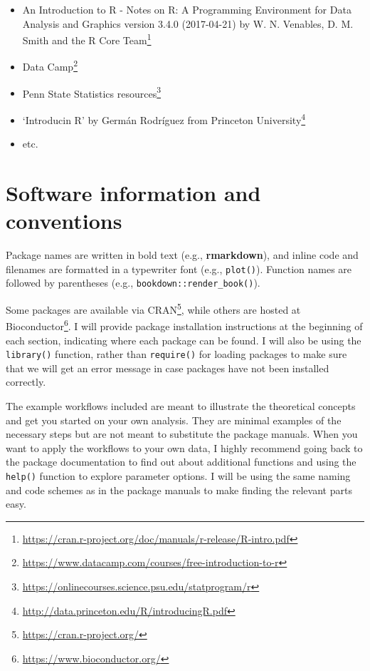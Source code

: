 \documentclass[12pt,]{krantz}
\providecommand{\tightlist}{%
  \setlength{\itemsep}{0pt}\setlength{\parskip}{0pt}}
\renewcommand{\href}[2]{#2\footnote{\url{#1}}}
\theoremstyle{definition}
\theoremstyle{definition}
\theoremstyle{definition}
\theoremstyle{remark}
\begin{document}
\begin{itemize}
\tightlist
\item
  \href{https://cran.r-project.org/doc/manuals/r-release/R-intro.pdf}{An
  Introduction to R - Notes on R: A Programming Environment for Data
  Analysis and Graphics version 3.4.0 (2017-04-21) by W. N. Venables, D.
  M. Smith and the R Core Team}
\item
  \href{https://www.datacamp.com/courses/free-introduction-to-r}{Data
  Camp}
\item
  \href{https://onlinecourses.science.psu.edu/statprogram/r}{Penn State
  Statistics resources}
\item
  \href{http://data.princeton.edu/R/introducingR.pdf}{`Introducin R' by
  Germán Rodríguez from Princeton University}
\item
  etc.
\end{itemize}

\section*{Software information and
conventions}\label{software-information-and-conventions}


Package names are written in bold text (e.g., \textbf{rmarkdown}), and
inline code and filenames are formatted in a typewriter font (e.g.,
\texttt{plot()}). Function names are followed by parentheses (e.g.,
\texttt{bookdown::render\_book()}).

Some packages are available via
\href{https://cran.r-project.org/}{CRAN}, while others are
hosted at
\href{https://www.bioconductor.org/}{Bioconductor}.
I will provide package installation instructions at the beginning of
each section, indicating where each package can be found. I will also be
using the \texttt{library()} function, rather than \texttt{require()}
for loading packages to make sure that we will get an error message in
case packages have not been installed correctly.

The example workflows included are meant to illustrate the theoretical
concepts and get you started on your own analysis. They are minimal
examples of the necessary steps but are not meant to substitute the
package manuals. When you want to apply the workflows to your own data,
I highly recommend going back to the package documentation to find out
about additional functions and using the \texttt{help()} function to
explore parameter options. I will be using the same naming and code
schemes as in the package manuals to make finding the relevant parts
easy.
\end{document}

